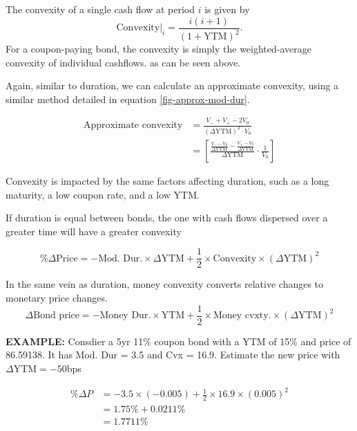 \documentclass[../notes_compiled.tex]{subfiles}
\begin{document}
\begin{itemize}
The convexity of a single cash flow at period $i$ is given by
\begin{equation*}
\text{Convexity}|_{i} = \frac{i(i+1)}{(1+\text{YTM})^{2}}.
\end{equation*}
For a coupon-paying bond, the convexity is simply the weighted-average convexity of individual cashflows. as can be seen above.

\item Again, similar to duration, we can calculate an approximate convexity, using a similar method detailed in equation \ref{fig-approx-mod-dur}.

\begin{align*}
\text{Approximate convexity} &= \frac{V_{-}+V_{+}-2V_{0}}{(\Delta\text{YTM})^{2}\cdot V_{0}} \\
&= \left[ \frac{\frac{V_{-} - V_{0}}{\Delta\text{YTM}} - \frac{V_{+} - V_{0}}{\Delta\text{YTM}}}{\Delta\text{YTM}} \cdot\frac{1}{V_{0}} \right] \nonumber
\end{align*}

\item Convexity is impacted by the same factors affecting duration, such as a long maturity, a low coupon rate, and a low YTM.
\item If duration is equal between bonds, the one with cash flows dispersed over a greater time will have a greater convexity

\begin{equation}
\%\Delta\text{Price} = -\text{Mod. Dur.} \times \Delta \text{YTM} + \frac{1}{2}\times \text{Convexity} \times (\Delta\text{YTM})^{2}
\end{equation}

\item In the same vein as duration, money convexity converts relative changes to monetary price changes.
\begin{equation}
\Delta\text{Bond price} = -\text{Money Dur.} \times \text{YTM} + \frac{1}{2}\times \text{Money cvxty.} \times (\Delta\text{YTM})^{2}
\end{equation}

{\color{RedViolet}
\item[] \textbf{EXAMPLE:} Consdier a 5yr 11\% coupon bond with a YTM of 15\% and price of 86.59138. It has Mod. Dur = 3.5 and Cvx = 16.9. Estimate the new price with $\Delta\text{YTM} = -50$bps
}
{\color{RoyalBlue}
\begin{align*}
\%\Delta P &= -3.5 \times (-0.005) + \frac{1}{2}\times 16.9 \times (0.005)^{2} \\
&=1.75\% + 0.0211\% \\
&=1.7711\%
\end{align*}

}
\end{itemize}
\end{document}
